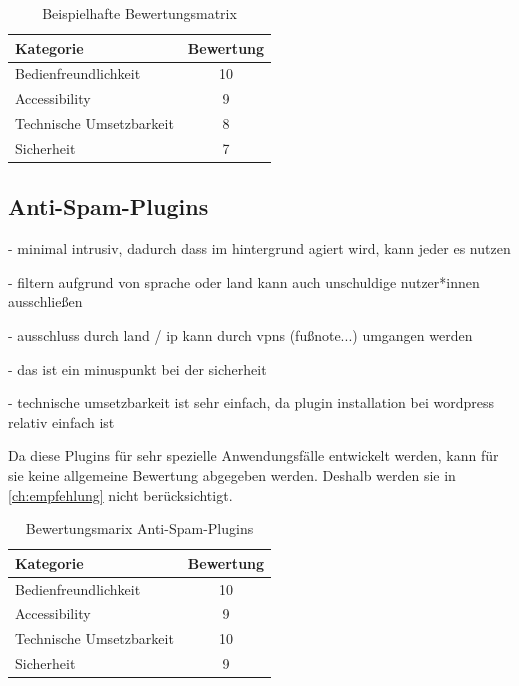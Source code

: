 \begin{table}[h!]
    \caption{Beispielhafte Bewertungsmatrix}
    \begin{center}
        \begin{tabular}{l|c}
            Kategorie                       & Bewertung \\\hline
            Bedienfreundlichkeit            & 10         \\
            Accessibility                   & 9        \\
            Technische Umsetzbarkeit        & 8         \\
            Sicherheit                      & 7         
        \end{tabular}
    \end{center}
\end{table}

\subsection{Anti-Spam-Plugins}

- minimal intrusiv, dadurch dass im hintergrund agiert wird, kann jeder es nutzen

- filtern aufgrund von sprache oder land kann auch unschuldige nutzer*innen ausschließen

- ausschluss durch land / ip kann durch vpns (fußnote...) umgangen werden

- das ist ein minuspunkt bei der sicherheit

- technische umsetzbarkeit ist sehr einfach, da plugin installation bei wordpress relativ einfach ist

Da diese Plugins für sehr spezielle Anwendungsfälle entwickelt werden,
kann für sie keine allgemeine Bewertung abgegeben werden.
Deshalb werden sie in \autoref{ch:empfehlung} nicht berücksichtigt.

\begin{table}[h!]
    \caption{Bewertungsmarix Anti-Spam-Plugins}
    \begin{center}
        \begin{tabular}{l|c}
            Kategorie                       & Bewertung \\\hline
            Bedienfreundlichkeit            & 10         \\
            Accessibility                   & 9        \\
            Technische Umsetzbarkeit        & 10         \\
            Sicherheit                      & 9         
        \end{tabular}
    \end{center}
\end{table} 

